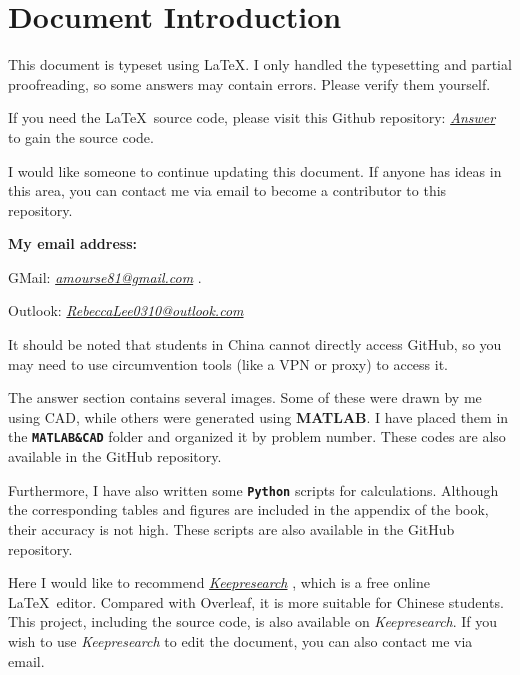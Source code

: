 \documentclass[12pt]{article}
\newcommand{\mylink}[2]{%
  \href{#1}{\textcolor{moranblue}{\textit{#2}}}%
}
\begin{document}
\thispagestyle{empty}



\newpage

\thispagestyle{empty}

\tableofcontents

\newpage

\setcounter{page}{1}

\section*{Document Introduction}

This document is typeset using \LaTeX. I only handled the typesetting and partial proofreading, \textcolor{BPink}{so some answers may contain errors}. Please verify them yourself.  

If you need the \LaTeX\ source code, please visit this Github repository: \mylink{https://github.com/RLee0310/Answer-for-XMU-Fundamentals-of-Gas-Dynamics/tree/main}{Answer} to gain the source code.  

I would like someone to continue updating this document. If anyone has ideas in this area, you can contact me via email to become a contributor to this repository.

\textbf{My email address:} 

GMail: \quad \mylink{mailto: amourse81@gmail.com}{amourse81@gmail.com}.

Outlook: \mylink{mailto: RebeccaLee0310@outlook.com}{RebeccaLee0310@outlook.com}

It should be noted that students in China cannot directly access GitHub, so you may need to use circumvention tools (like a VPN or proxy) to access it.

The answer section contains several images. Some of these were drawn by me using CAD, while others were generated using \textbf{MATLAB}. I have placed them in the \textbf{\texttt{MATLAB\&CAD}} folder and organized it by problem number. These codes are also available in the GitHub repository. 

Furthermore, I have also written some \textbf{\texttt{Python}} scripts for calculations. Although the corresponding tables and figures are included in the appendix of the book, their accuracy is not high. These scripts are also available in the GitHub repository.

Here I would like to recommend \mylink{https://www.keepresearch.com}{Keepresearch}, which is a free online \LaTeX\ editor. Compared with Overleaf, it is more suitable for Chinese students.
This project, including the source code, is also available on \textit{Keepresearch}. If you wish to use \textit{Keepresearch} to edit the document, you can also contact me via email.
\end{document}
